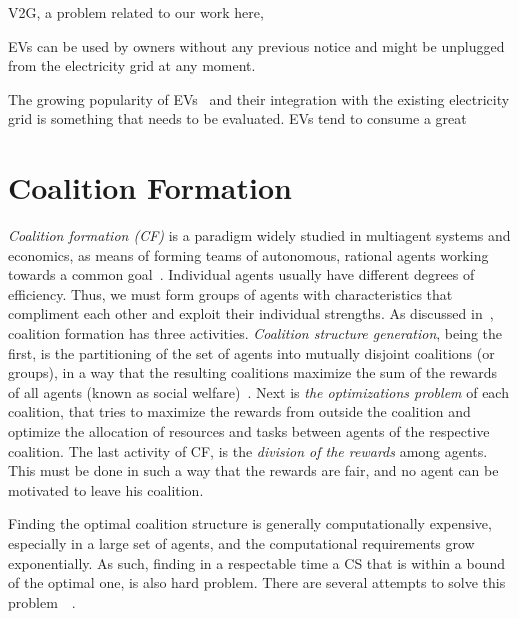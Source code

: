V2G, a problem related to our work here, 

EVs can be used by owners without any previous notice and might be unplugged from the electricity grid at any moment. 

The growing popularity of EVs~\cite{globalev2016} and their integration with the existing electricity grid is something that needs to be evaluated. EVs tend to consume a great

\section{Coalition Formation}
{\em Coalition formation (CF)} is a paradigm widely studied in multiagent systems and economics, as means of forming teams of autonomous, rational agents working towards a common goal~\cite{chalkiadakis2011computational}. Individual agents usually have different degrees of efficiency. Thus, we must form groups of agents with characteristics that compliment each other and exploit their individual strengths\cite{shehory1998methods}.
As discussed in~\cite{sandholm1999coalition}, coalition formation has three activities. {\em Coalition structure generation}, being the first, is the partitioning of the set of agents into mutually disjoint coalitions (or groups), in a way that the resulting coalitions maximize the sum of the rewards of all agents (known as social welfare)~\cite{rahwan2009anytime}. Next is {\em the optimizations problem} of each coalition, that tries to maximize the rewards from outside the coalition and optimize the allocation of resources and tasks between agents of the respective coalition. The last activity of CF, is the {\em division of the rewards} among agents. This must be done in such a way that the rewards are fair, and no agent can be motivated to leave his coalition.

Finding the optimal coalition structure is generally computationally expensive, especially in a large set of agents, and the computational requirements grow exponentially. As such, finding in a respectable time a CS that is within a bound of the optimal one, is also hard problem. There are several attempts to solve this problem~\cite{sandholm1999coalition}~\cite{rahwan2009anytime}.

